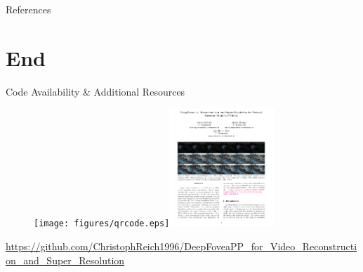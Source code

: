 \documentclass[
	ngerman,
	aspectratio=169,
	color={accentcolor=3d},
	logo=false,
	colorframetitle=true,
	]{tudabeamer}
\begin{document}

\begin{frame}[allowframebreaks]{References}
    
    
\end{frame}


\section{End}

\begin{frame}{Code Availability \& Additional Resources}
    \begin{figure}
        \centering
        \texttt{[image: figures/qrcode.eps]}\hspace{2.5cm}\includegraphics[width=4cm]{figures/paper.PNG}
    \end{figure}
    \begin{center}
        \begin{large}
            \url{https://github.com/ChristophReich1996/DeepFoveaPP_for_Video_Reconstruction_and_Super_Resolution}
        \end{large}
    \end{center}
\end{frame}
\end{document}
